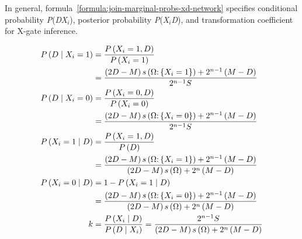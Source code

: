 \documentclass{article}
\numberwithin{equation}{section}
\numberwithin{figure}{section}
\numberwithin{table}{section}
\begin{document}
In general, formula~\ref{formula:join-marginal-probs-xd-network} specifies conditional probability \textit{P}(\textit{D{\textbar}X${}_{i}$}), posterior probability \textit{P}(\textit{X${}_{i}${\textbar}D}), and transformation coefficient for X-gate inference.

\begin{equation}
\begin{split}
P\left(D\mathrel{\left|\vphantom{D X_i=1}\right.\kern-\nulldelimiterspace}X_i=1\right)&=\frac{P\left(X_i=1,D\right)}{P\left(X_i=1\right)}\\
&=\frac{\left(2D-M\right)s\left(\mathrm{\Omega }\mathrm{:}\left\{X_i=1\right\}\right)+2^{n-1}\left(M-D\right)}{2^{n-1}S}\\
P\left(D\mathrel{\left|\vphantom{D X_i=0}\right.\kern-\nulldelimiterspace}X_i=0\right)&=\frac{P\left(X_i=0,D\right)}{P\left(X_i=0\right)}\\
&=\frac{\left(2D-M\right)s\left(\mathrm{\Omega }\mathrm{:}\left\{X_i=0\right\}\right)+2^{n-1}\left(M-D\right)}{2^{n-1}S}\\
P\left(X_i=1\mathrel{\left|\vphantom{X_i=1 D}\right.\kern-\nulldelimiterspace}D\right)&=\frac{P\left(X_i=1,D\right)}{P\left(D\right)}\\
&=\frac{\left(2D-M\right)s\left(\mathrm{\Omega }\mathrm{:}\left\{X_i=1\right\}\right)+2^{n-1}\left(M-D\right)}{\left(2D-M\right)s\left(\mathrm{\Omega }\right)+2^n\left(M-D\right)}\\
P\left(X_i=0\mathrel{\left|\vphantom{X_i=0 D}\right.\kern-\nulldelimiterspace}D\right)&=1-P\left(X_i=1\mathrel{\left|\vphantom{X_i=1 D}\right.\kern-\nulldelimiterspace}D\right)\\
&=\frac{\left(2D-M\right)s\left(\mathrm{\Omega }\mathrm{:}\left\{X_i=0\right\}\right)+2^{n-1}\left(M-D\right)}{\left(2D-M\right)s\left(\mathrm{\Omega }\right)+2^n\left(M-D\right)}\\
k&=\frac{P\left(X_i\mathrel{\left|\vphantom{X_i D}\right.\kern-\nulldelimiterspace}D\right)}{P\left(D\mathrel{\left|\vphantom{D X_i}\right.\kern-\nulldelimiterspace}X_i\right)}=\frac{2^{n-1}S}{\left(2D-M\right)s\left(\mathrm{\Omega }\right)+2^n\left(M-D\right)}
\end{split}
\label{formula:join-marginal-probs-xd-network}
\end{equation}
\end{document}
